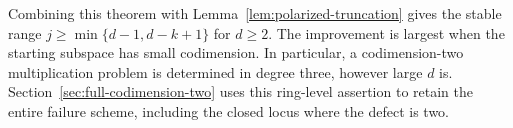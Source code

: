 Combining this theorem with Lemma~\ref{lem:polarized-truncation}
gives the stable range $j\ge\min\{d-1,d-k+1\}$ for $d\ge2$.
The improvement is largest when the starting subspace has small
codimension. In particular, a codimension-two multiplication problem
is determined in degree three, however large $d$ is. Section~\ref{sec:full-codimension-two}
uses this ring-level assertion to retain the entire failure scheme,
including the closed locus where the defect is two.
